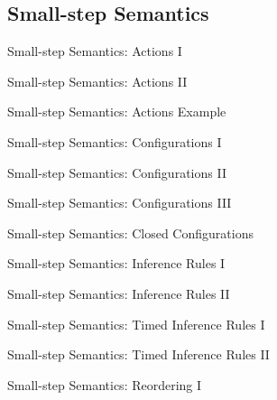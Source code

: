 \documentclass{beamer}
\begin{document}
\subsection{Small-step Semantics}

\begin{frame}{Small-step Semantics: Actions I}
\BITactionsA{}
\end{frame}

\begin{frame}{Small-step Semantics: Actions II}
\BITactionsB{}
\end{frame}

\begin{frame}{Small-step Semantics: Actions Example}
\BITactionExample{}
\end{frame}

\begin{frame}{Small-step Semantics: Configurations I}
\BITconfigurationsA{}
\end{frame}

\begin{frame}{Small-step Semantics: Configurations II}
\BITconfigurationsB{}
\end{frame}

\begin{frame}{Small-step Semantics: Configurations III}
\BITconfigurationsC{}
\end{frame}

\begin{frame}{Small-step Semantics: Closed Configurations}
\BITclosedConfigurations{}
\end{frame}

\begin{frame}{Small-step Semantics: Inference Rules I}
\BITrulesA{}
\end{frame}

\begin{frame}{Small-step Semantics: Inference Rules II}
\BITrulesB{}
\end{frame}

\begin{frame}{Small-step Semantics: Timed Inference Rules I}
\BITtimedRulesA{}
\end{frame}
  
\begin{frame}{Small-step Semantics: Timed Inference Rules II}
\BITtimedRulesB{}
\end{frame}

\begin{frame}{Small-step Semantics: Reordering I}
\BITreordering{}
\end{frame}
\end{document}
